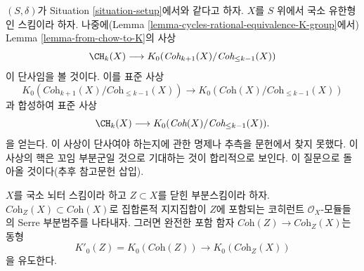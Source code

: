 \begin{remark}
\label{remark-good-cases-K-A}
$(S, \delta)$가 Situation \ref{situation-setup}에서와 같다고 하자.
$X$를 $S$ 위에서 국소 유한형인 스킴이라 하자. 나중에(Lemma
\ref{lemma-cycles-rational-equivalence-K-group}에서) Lemma
\ref{lemma-from-chow-to-K}의 사상
$$
\CH_k(X)
\longrightarrow
K_0(\textit{Coh}_{k + 1}(X)/\textit{Coh}_{\leq k - 1}(X))
$$
이 단사임을 볼 것이다. 이를 표준 사상
$$
K_0(\textit{Coh}_{k + 1}(X)/\textit{Coh}_{\leq k - 1}(X))
\longrightarrow
K_0(\textit{Coh}(X)/\textit{Coh}_{\leq k - 1}(X))
$$
과 합성하여 표준 사상
$$
\CH_k(X)
\longrightarrow
K_0(\textit{Coh}(X)/\textit{Coh}_{\leq k - 1}(X)).
$$
을 얻는다. 이 사상이 단사여야 하는지에 관한 명제나 추측을 문헌에서
찾지 못했다. 이 사상의 핵은 꼬임 부분군일 것으로 기대하는 것이
합리적으로 보인다. 이 질문으로 돌아올 것이다(추후 참고문헌 삽입).
\end{remark}

\begin{lemma}
\label{lemma-K-coherent-supported-on-closed}
$X$를 국소 뇌터 스킴이라 하고 $Z \subset X$를 닫힌 부분스킴이라 하자.
$\textit{Coh}_Z(X) \subset \textit{Coh}(X)$로 집합론적 지지집합이 $Z$에
포함되는 코히런트 $\mathcal{O}_X$-모듈들의 Serre 부분범주를 나타내자.
그러면 완전한 포함 함자
$\textit{Coh}(Z) \to \textit{Coh}_Z(X)$는 동형
$$
K'_0(Z) = K_0(\textit{Coh}(Z)) \longrightarrow K_0(\textit{Coh}_Z(X))
$$
을 유도한다.
\end{lemma}

